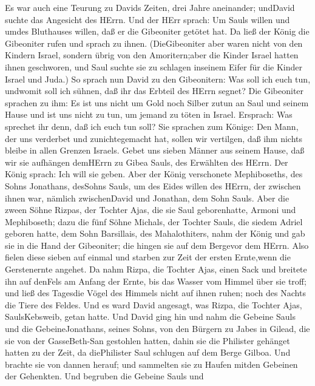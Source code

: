  Es war auch eine Teurung zu Davids Zeiten, drei Jahre
aneinander; undDavid suchte das Angesicht des HErrn. Und der HErr
sprach: Um Sauls willen und umdes Bluthauses willen, daß er die
Gibeoniter getötet hat.  Da ließ der König die Gibeoniter
rufen und sprach zu ihnen. (DieGibeoniter aber waren nicht von den
Kindern Israel, sondern übrig von den Amoritern;aber die Kinder Israel
hatten ihnen geschworen, und Saul suchte sie zu schlagen inseinem Eifer
für die Kinder Israel und Juda.)  So sprach nun David zu den
Gibeonitern: Was soll ich euch tun, undwomit soll ich sühnen, daß ihr
das Erbteil des HErrn segnet?  Die Gibeoniter sprachen zu
ihm: Es ist uns nicht um Gold noch Silber zutun an Saul und seinem Hause
und ist uns nicht zu tun, um jemand zu töten in Israel. Ersprach: Was
sprechet ihr denn, daß ich euch tun soll?  Sie sprachen zum
Könige: Den Mann, der uns verderbet und zunichtegemacht hat, sollen wir
vertilgen, daß ihm nichts bleibe in allen Grenzen Israels. 
Gebet uns sieben Männer aus seinem Hause, daß wir sie aufhängen demHErrn
zu Gibea Sauls, des Erwählten des HErrn. Der König sprach: Ich will sie
geben.  Aber der König verschonete Mephiboseths, des Sohns
Jonathans, desSohns Sauls, um des Eides willen des HErrn, der zwischen
ihnen war, nämlich zwischenDavid und Jonathan, dem Sohn Sauls.
 Aber die zween Söhne Rizpas, der Tochter Ajas, die sie Saul
geborenhatte, Armoni und Mephiboseth; dazu die fünf Söhne Michals, der
Tochter Sauls, die siedem Adriel geboren hatte, dem Sohn Barsillais, des
Mahalothiters, nahm der König  und gab sie in die Hand der
Gibeoniter; die hingen sie auf dem Bergevor dem HErrn. Also fielen diese
sieben auf einmal und starben zur Zeit der ersten Ernte,wenn die
Gerstenernte angehet.  Da nahm Rizpa, die Tochter Ajas,
einen Sack und breitete ihn auf denFels am Anfang der Ernte, bis das
Wasser vom Himmel über sie troff; und ließ des Tagesdie Vögel des
Himmels nicht auf ihnen ruhen; noch des Nachts die Tiere des Feldes.
 Und es ward David angesagt, was Rizpa, die Tochter Ajas,
SaulsKebsweib, getan hatte.  Und David ging hin und nahm
die Gebeine Sauls und die GebeineJonathans, seines Sohns, von den
Bürgern zu Jabes in Gilead, die sie von der GasseBeth-San gestohlen
hatten, dahin sie die Philister gehänget hatten zu der Zeit, da
diePhilister Saul schlugen auf dem Berge Gilboa.  Und
brachte sie von dannen herauf; und sammelten sie zu Haufen mitden
Gebeinen der Gehenkten.  Und begruben die Gebeine Sauls und
